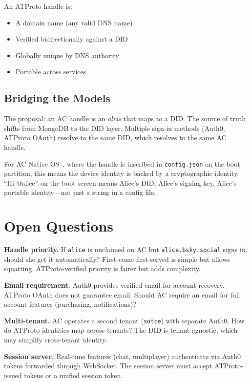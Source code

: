 \documentclass[10pt,letterpaper,twocolumn]{article}
\begin{document}
An ATProto handle is:
\begin{itemize}
  \item A domain name (any valid DNS name)
  \item Verified bidirectionally against a DID
  \item Globally unique by DNS authority
  \item Portable across services
\end{itemize}

\subsection{Bridging the Models}

The proposal: an AC handle is an \emph{alias} that maps to a DID. The source of truth shifts from MongoDB to the DID layer. Multiple sign-in methods (Auth0, ATProto OAuth) resolve to the same DID, which resolves to the same AC handle.

For AC Native OS~\citep{scudder2026os}, where the handle is inscribed in \texttt{config.json} on the boot partition, this means the device identity is backed by a cryptographic identity. ``Hi @alice'' on the boot screen means Alice's DID, Alice's signing key, Alice's portable identity---not just a string in a config file.


\section{Open Questions}
\label{sec:questions}

\textbf{Handle priority.} If \texttt{alice} is unclaimed on AC but \texttt{alice.bsky.social} signs in, should she get it automatically? First-come-first-served is simple but allows squatting. ATProto-verified priority is fairer but adds complexity.

\textbf{Email requirement.} Auth0 provides verified email for account recovery. ATProto OAuth does not guarantee email. Should AC require an email for full account features (purchasing, notifications)?

\textbf{Multi-tenant.} AC operates a second tenant (\texttt{sotce}) with separate Auth0. How do ATProto identities map across tenants? The DID is tenant-agnostic, which may simplify cross-tenant identity.

\textbf{Session server.} Real-time features (chat, multiplayer) authenticate via Auth0 tokens forwarded through WebSocket. The session server must accept ATProto-issued tokens or a unified session token.
\end{document}
